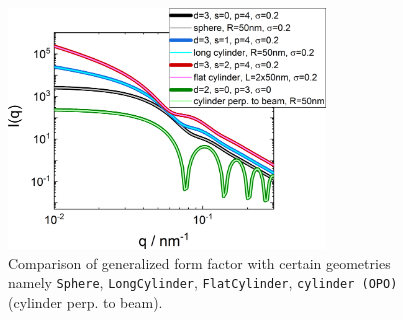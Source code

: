 \begin{figure}[hbt]
\begin{center}
\includegraphics[width=0.75\textwidth]{../images/form_factor/gFF/gFF.png}
\end{center}
\caption{Comparison of generalized form factor with certain geometries namely \texttt{Sphere}, \texttt{LongCylinder}, \texttt{FlatCylinder}, \texttt{cylinder (OPO)} (cylinder perp. to beam).} \label{fig:gFFIQ}
\end{figure} 